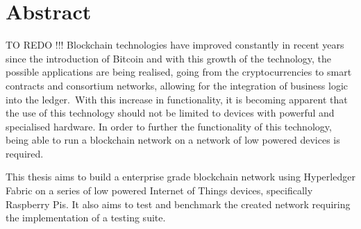 \chapter*{Abstract}\label{abstract}


TO REDO !!!
Blockchain technologies have improved constantly in recent years since the introduction of Bitcoin and with this growth of the technology, the possible applications are being realised, going from the cryptocurrencies to smart contracts and consortium networks, allowing for the integration of business logic into the ledger. With this increase in functionality, it is becoming apparent that the use of this technology should not be limited to devices with powerful and specialised hardware. In order to further the functionality of this technology, being able to run a blockchain network on a network of low powered devices is required.

This thesis aims to build a enterprise grade blockchain network using Hyperledger Fabric on a series of low powered Internet of Things devices, specifically Raspberry Pis. It also aims to test and benchmark the created network requiring the implementation of a testing suite.